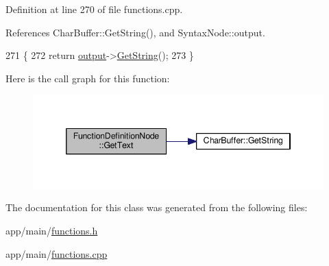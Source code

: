 Definition at line 270 of file functions.\+cpp.



References Char\+Buffer\+::\+Get\+String(), and Syntax\+Node\+::output.


\begin{DoxyCode}
271 \{
272     \textcolor{keywordflow}{return} \hyperlink{classSyntaxNode_a1180628cbe3fce43930cee0df5a9ce5c}{output}->\hyperlink{classCharBuffer_a7dfd3feaaf80f318ba44efe15b1ec44b}{GetString}();
273 \}
\end{DoxyCode}


Here is the call graph for this function\+:\nopagebreak
\begin{figure}[H]
\begin{center}
\leavevmode
\includegraphics[width=346pt]{classFunctionDefinitionNode_a36b853a90870fab9f1dbebeaa9b9cc18_cgraph}
\end{center}
\end{figure}




The documentation for this class was generated from the following files\+:\begin{DoxyCompactItemize}
\item 
app/main/\hyperlink{functions_8h}{functions.\+h}\item 
app/main/\hyperlink{functions_8cpp}{functions.\+cpp}\end{DoxyCompactItemize}
